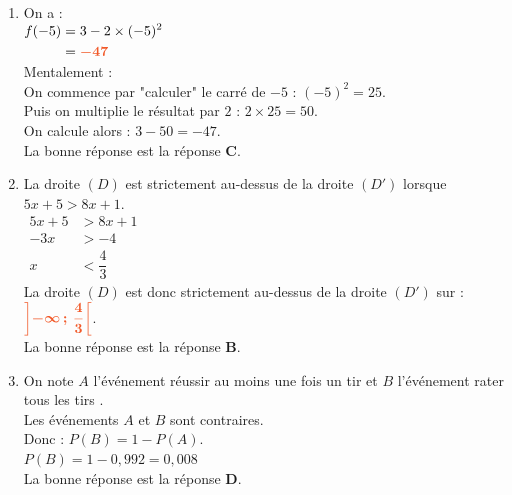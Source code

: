 \documentclass[a4paper,11pt]{article}
\begin{document}
\begin{seanceD}{}
\begin{enumerate}
\item On a :\\
          $\begin{aligned}
          f(-5)&=3- 2\times (-5)^2\\
          &={\color[HTML]{F15929}\boldsymbol{-47}}
          \end{aligned}$\\{\color[HTML]{216D9A} Mentalement : \\
    On commence par "calculer" le carré de $-5$ :  $(-5)^2=25$.\\
    Puis on multiplie le résultat par $2$ : $2\times 25=50$.\\
    On calcule alors : $3-50=-47$.}\\La bonne réponse est la réponse {\bfseries \color[HTML]{F15929}C}.

\item La droite $(D)$ est strictement au-dessus de la droite $(D')$ lorsque $5x+5>8x+1$.\\
     $\begin{aligned}
     5x+5&>8x+1\\
     -3x&>-4\\
     x&<\dfrac{4}{3}
     \end{aligned}$\\
     La droite $(D)$ est donc strictement au-dessus de la droite $(D')$ sur : 
     ${\color[HTML]{F15929}\boldsymbol{\left]-\infty\,;\,\dfrac{4}{3}\right[}}$.\\La bonne réponse est la réponse {\bfseries \color[HTML]{F15929}B}.

\item On note $A$ l'événement \og{} réussir au moins une fois un tir \fg{} et $B$ l'événement \og{} rater tous les tirs \fg{}.\\
Les événements $A$ et $B$ sont contraires.\\
Donc : $P(B) = 1 - P(A)$.\\
$P(B) = 1 - 0{,}992 = 0{,}008$\\La bonne réponse est la réponse {\bfseries \color[HTML]{F15929}D}.

\end{enumerate}

\end{seanceD}
\end{document}
